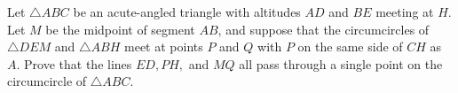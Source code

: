 Let $\triangle ABC$ be an acute-angled triangle with altitudes $AD$ and $BE$ meeting at $H$. Let $M$ be the midpoint of segment $AB$,  and suppose that the circumcircles of $\triangle DEM$ and $\triangle ABH$ meet at points $P$ and $Q$ with $P$ on the same side of $CH$ as $A$. Prove that the lines $ED, PH,$ and $MQ$ all pass through a single point on the circumcircle of $\triangle ABC$.